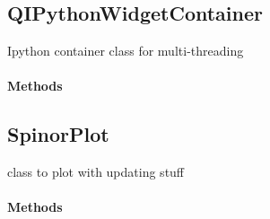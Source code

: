 \documentclass[letterpaper,10pt,english]{sphinxmanual}
\begin{document}
\subsection{QIPythonWidgetContainer}
\label{QIPythonWidgetContainer::doc}\label{QIPythonWidgetContainer:qipythonwidgetcontainer}

\begin{fulllineitems}
\label{QIPythonWidgetContainer:Ipython.QIPythonWidgetContainer}
Ipython container class for multi-threading
\paragraph{Methods}

\end{fulllineitems}



\subsection{SpinorPlot}
\label{SpinorPlot::doc}\label{SpinorPlot:spinorplot}

\begin{fulllineitems}
\label{SpinorPlot:Ipython.SpinorPlot}
class to plot with updating stuff
\paragraph{Methods}

\begin{fulllineitems}
\label{SpinorPlot:Ipython.SpinorPlot.get_vars}
\end{fulllineitems}


\begin{fulllineitems}
\label{SpinorPlot:Ipython.SpinorPlot.set_axis}
\end{fulllineitems}


\begin{fulllineitems}
\label{SpinorPlot:Ipython.SpinorPlot.update_plot}
\end{fulllineitems}


\end{fulllineitems}
\end{document}
